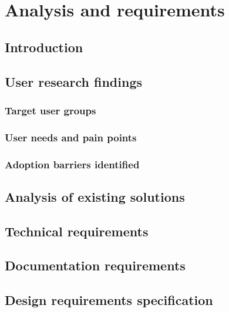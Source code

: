 \chapter{Analysis and requirements}
\label{chap:analysis}

\section{Introduction}
\label{sec:analysis-intro}

\section{User research findings}
\label{sec:analysis-users}

\subsection{Target user groups}
\subsection{User needs and pain points}
\subsection{Adoption barriers identified}

\section{Analysis of existing solutions}
\label{sec:analysis-existing}

\section{Technical requirements}
\label{sec:analysis-technical}

\section{Documentation requirements}
\label{sec:analysis-documentation}

\section{Design requirements specification}
\label{sec:analysis-spec}
